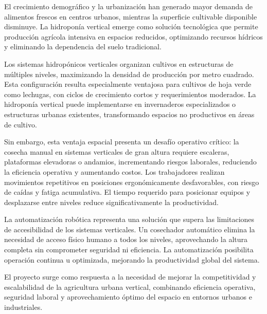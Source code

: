 
El crecimiento demográfico y la urbanización han generado mayor demanda de alimentos frescos en centros urbanos, mientras la superficie cultivable disponible disminuye. La hidroponía vertical emerge como solución tecnológica que permite producción agrícola intensiva en espacios reducidos, optimizando recursos hídricos y eliminando la dependencia del suelo tradicional.

Los sistemas hidropónicos verticales organizan cultivos en estructuras de múltiples niveles, maximizando la densidad de producción por metro cuadrado. Esta configuración resulta especialmente ventajosa para cultivos de hoja verde como lechugas, con ciclos de crecimiento cortos y requerimientos moderados. La hidroponía vertical puede implementarse en invernaderos especializados o estructuras urbanas existentes, transformando espacios no productivos en áreas de cultivo.

Sin embargo, esta ventaja espacial presenta un desafío operativo crítico: la cosecha manual en sistemas verticales de gran altura requiere escaleras, plataformas elevadoras o andamios, incrementando riesgos laborales, reduciendo la eficiencia operativa y aumentando costos. Los trabajadores realizan movimientos repetitivos en posiciones ergonómicamente desfavorables, con riesgo de caídas y fatiga acumulativa. El tiempo requerido para posicionar equipos y desplazarse entre niveles reduce significativamente la productividad.

La automatización robótica representa una solución que supera las limitaciones de accesibilidad de los sistemas verticales. Un cosechador automático elimina la necesidad de acceso físico humano a todos los niveles, aprovechando la altura completa sin comprometer seguridad ni eficiencia. La automatización posibilita operación continua u optimizada, mejorando la productividad global del sistema.

El proyecto surge como respuesta a la necesidad de mejorar la competitividad y escalabilidad de la agricultura urbana vertical, combinando eficiencia operativa, seguridad laboral y aprovechamiento óptimo del espacio en entornos urbanos e industriales.
